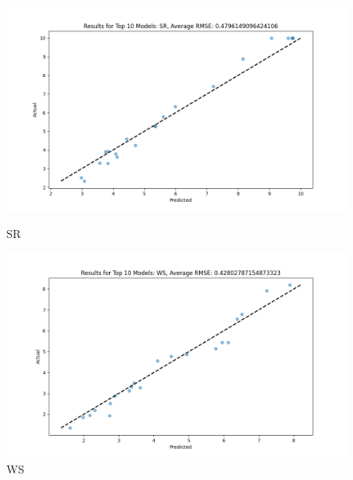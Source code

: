 \begin{figure}[H]
    \centering
    \begin{minipage}{0.495\textwidth}
        \centering
        \includegraphics[width=\linewidth]{reg_section_all/images_reg_ensemble/ensemble_learning_rmse_plot_top_10_Models_SR.png}
        \caption{SR}
        \label{fig:sr_ensemble}
    \end{minipage}\hfill
    \begin{minipage}{0.495\textwidth}
        \centering
        \includegraphics[width=\linewidth]{reg_section_all/images_reg_ensemble/ensemble_learning_rmse_plot_top_10_Models_WS.png}
        \caption{WS}
        \label{fig:ws_ensemble}
    \end{minipage}
\end{figure}

